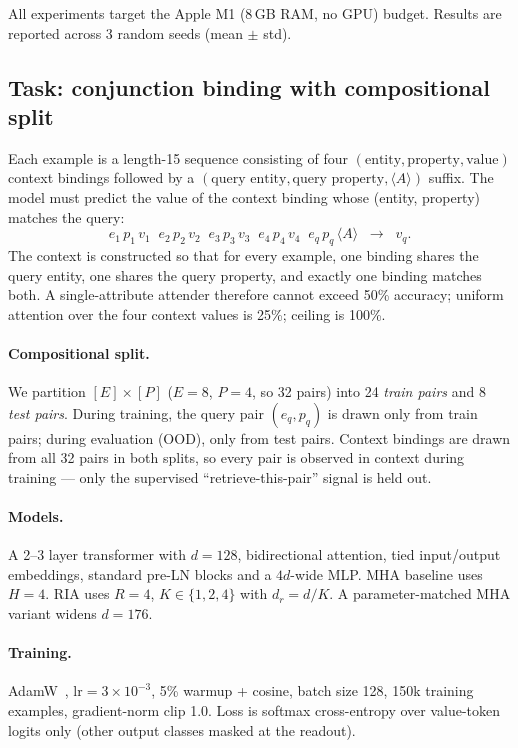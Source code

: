\documentclass{article}
\begin{document}
All experiments target the Apple M1 (8\,GB RAM, no GPU) budget.
Results are reported across 3 random seeds (mean $\pm$ std).

\subsection{Task: conjunction binding with compositional split}

Each example is a length-15 sequence consisting of four
$(\text{entity}, \text{property}, \text{value})$ context bindings
followed by a $(\text{query entity}, \text{query property}, \langle A
\rangle)$ suffix. The model must predict the value of the context
binding whose (entity, property) matches the query:
\[
  e_1\,p_1\,v_1 \;\; e_2\,p_2\,v_2 \;\; e_3\,p_3\,v_3 \;\; e_4\,p_4\,v_4
  \;\; e_q\,p_q\,\langle A \rangle \;\;\longrightarrow\;\; v_{q}.
\]
The context is constructed so that for every example, one binding
shares the query entity, one shares the query property, and exactly
one binding matches both. A single-attribute attender therefore cannot
exceed 50\% accuracy; uniform attention over the four context values is
25\%; ceiling is 100\%.

\paragraph{Compositional split.} We partition $[E] \times [P]$ ($E{=}8$,
$P{=}4$, so 32 pairs) into 24 \emph{train pairs} and 8 \emph{test
pairs}. During training, the query pair $(e_q, p_q)$ is drawn only from
train pairs; during evaluation (OOD), only from test pairs. Context
bindings are drawn from all 32 pairs in both splits, so every pair is
observed in context during training --- only the supervised
``retrieve-this-pair'' signal is held out.

\paragraph{Models.} A 2--3 layer transformer with $d=128$, bidirectional
attention, tied input/output embeddings, standard pre-LN blocks and a
$4 d$-wide MLP. MHA baseline uses $H=4$. RIA uses $R=4$, $K \in \{1,
2, 4\}$ with $d_r = d/K$. A parameter-matched MHA variant widens
$d{=}176$.

\paragraph{Training.} AdamW~\citep{loshchilov2019adamw},
$\mathrm{lr}=3\!\times\!10^{-3}$, 5\% warmup + cosine,
batch size 128, 150k training examples, gradient-norm clip 1.0.
Loss is softmax cross-entropy over value-token logits only (other
output classes masked at the readout).
\end{document}
